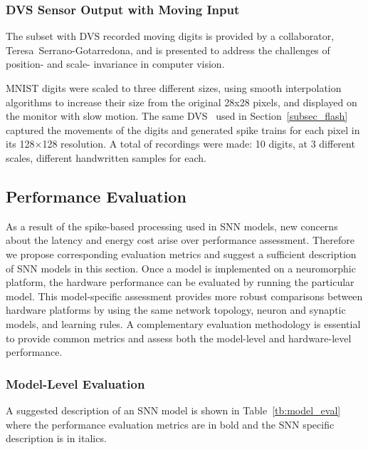\subsubsection{DVS Sensor Output with Moving Input}

The subset with DVS recorded moving digits is provided by a collaborator, Teresa~Serrano-Gotarredona, and is  presented to address the challenges of position- and scale- invariance in computer vision.

MNIST digits were scaled to three different sizes, using smooth interpolation algorithms to increase their size from the original 28x28 pixels, and displayed on the monitor with slow motion. 
The same DVS~\citep{serrano2013128} used in Section~\ref{subsec_flash} captured the movements of the digits and generated spike trains for each pixel in its 128$\times$128 resolution.
A total of \protect{} \protect{} recordings were made: 10 digits, at 3 different scales, \protect{} \protect{} different handwritten samples for each.

\subsection{Performance Evaluation}
\label{sec:eval}
As a result of the spike-based processing used in SNN models, new concerns about the latency and energy cost arise over performance assessment.
Therefore we propose corresponding evaluation metrics and suggest a sufficient description of SNN models in this section.
Once a model is implemented on a neuromorphic platform, the hardware performance can be evaluated by running the particular model.
This model-specific assessment provides more robust comparisons between hardware platforms by using the same network topology, neuron and synaptic models, and learning rules. 
A complementary evaluation methodology is essential to provide common metrics and assess both the model-level and hardware-level performance.


\subsubsection{Model-Level Evaluation}
\label{subsec:model}

A suggested description of an SNN model is shown in Table~\ref{tb:model_eval} where the performance evaluation metrics are in bold and the SNN specific description is in italics.

